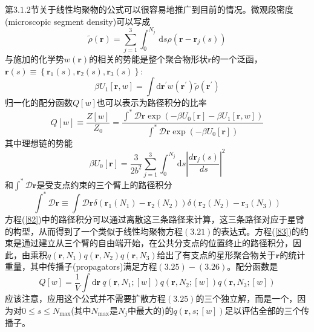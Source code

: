 第$3.1.2$节关于线性均聚物的公式可以很容易地推广到目前的情况。微观段密度(microscopic segment density)可以写成
\begin{equation}
\tilde{\rho}(\mathbf{r})=\sum_{j=1}^3 \int_{0}^{N_j}\, \mathrm{d}s\rho(\mathbf{r}-\mathbf{r}_{j}(s))
\end{equation}
与施加的化学势$w (\mathbf{r})$的相关的势能是整个聚合物形状$\mathbf{r}$的一个泛函，$\mathbf{r}(s)\equiv \left\{ \mathbf{r}_1(s),\mathbf{r}_2(s),\mathbf{r}_3(s) \right\}:$
\begin{equation}
\beta U_1[\mathbf{r},w]=\int \mathrm{d}\mathbf{r}^{'}w(\mathbf{r}^{'})\tilde{\rho}(\mathbf{r}^{'})
\end{equation}
归一化的配分函数$Q[w]$也可以表示为路径积分的比率
\begin{equation}
Q[w]\equiv \frac{Z[w]}{Z_0}=\frac{\int^{*}\mathcal{D}\mathbf{r}\exp (-\beta U_0[\mathbf{r}]-\beta U_1[\mathbf{r},w])}{\int^{*}\mathcal{D}\mathbf{r}\exp (-\beta U_0[\mathbf{r}])} \label{82}
\end{equation}
其中理想链的势能
\begin{equation}
\beta U_0[\mathbf{r}]=\frac{3}{2b^2}\sum_{j=1}^3\int_{0}^{N_j} \mathrm{d}s\left| \frac{d\mathbf{r}_j(s)}{ds} \right|^2
\end{equation}
和$\int^{*}\mathcal{D}\mathbf{r}$是受支点约束的三个臂上的路径积分
\begin{equation}
\int^{*}\mathcal{D}\mathbf{r}\equiv \int \mathcal{D}\mathbf{r}\delta (\mathbf{r}_1(N_1)-\mathbf{r}_2(N_2))\delta (\mathbf{r}_2(N_2)-\mathbf{r}_3(N_3))  \label{83}
\end{equation}
方程(\ref{82})中的路径积分可以通过离散这三条路径来计算，这三条路径对应于星臂的构型，从而得到了一个类似于线性均聚物方程$(3.21)$的表达式。方程(\ref{83})的约束是通过建立从三个臂的自由端开始，在公共分支点的位置终止的路径积分，因此，由乘积$q(\mathbf{r},N_1)q(\mathbf{r},N_2)q(\mathbf{r},N_3)$给出了有支点的星形聚合物关于$\mathbf{r}$的统计重量，其中传播子(propagators)满足方程$(3.25)-(3.26)$。配分函数是
\begin{equation}
Q[w]=\frac{1}{V}\int \mathrm{d}\mathbf{r}~q(\mathbf{r},N_1;[w])q(\mathbf{r},N_2;[w])q(\mathbf{r},N_3;[w])
\end{equation}
应该注意，应用这个公式并不需要扩散方程$(3.25)$的三个独立解，而是一个，因为对$0\leq s\leq N_{\max}$(其中$N_{\max}$是$N_j$中最大的)的$q(\mathbf{r},s;[w])$足以评估全部的三个传播子。

